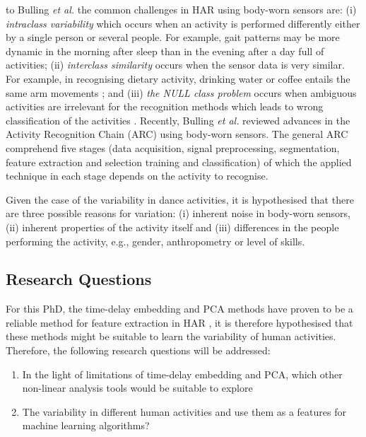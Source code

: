 \documentclass[10pt,journal,compsoc]{IEEEtran}
\begin{document}
 to Bulling \emph{et al.}  \cite{bulling2014} the common challenges in
HAR using body-worn sensors are:
(i) \textit{intraclass variability} which occurs when an activity is performed differently
either by a single person or several people. For example, gait patterns may be more
dynamic in the morning after sleep than in the evening after a day full of activities;
(ii) \textit{interclass similarity} occurs when the sensor data is very similar. For example,
in recognising dietary activity, drinking water or coffee entails the same arm movements
\cite{amft2008phd};
and (iii) \textit{the NULL class problem} occurs
when ambiguous activities are irrelevant for the recognition methods
which leads to wrong classification of the activities \cite{amft2011}.
Recently, Bulling \emph{et al.}  \cite{bulling2014} reviewed advances in
the Activity Recognition Chain (ARC) using body-worn sensors.
The general ARC comprehend five stages (data acquisition, signal preprocessing,
segmentation, feature extraction and selection training and classification) of which
the applied technique in each stage depends on the activity to recognise.

Given the case of the variability in dance activities, it is hypothesised that
there are three possible reasons for variation:
(i) inherent noise in body-worn sensors,
(ii) inherent properties of the activity itself and
(iii) differences in the people performing the activity,
e.g., gender, anthropometry or level of skills.

\subsection{Research Questions}

For this PhD, the time-delay embedding and PCA methods
have proven to be a reliable method
for feature extraction in HAR \cite{Frank2010, Sama2013},
it is therefore hypothesised that these methods might be suitable
to learn the variability of human activities.
Therefore, the following research questions will be addressed:
\begin{enumerate}
 \item In the light of limitations of time-delay embedding and PCA,
 which other non-linear analysis tools would be suitable to explore
\item The variability in different human activities and use them as a features
 for machine learning algorithms?


\end{enumerate}
\end{document}
